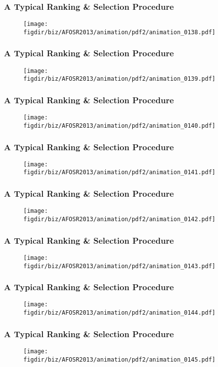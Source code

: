 \documentclass[13pt]{beamer}
\newcommand{\figdir}{../../fig}
\begin{document}
\begin{frame}\frametitle{A Typical Ranking \& Selection Procedure}\begin{figure}\texttt{[image: \\figdir/biz/AFOSR2013/animation/pdf2/animation\_0138.pdf]}\end{figure}\end{frame}
\begin{frame}\frametitle{A Typical Ranking \& Selection Procedure}\begin{figure}\texttt{[image: \\figdir/biz/AFOSR2013/animation/pdf2/animation\_0139.pdf]}\end{figure}\end{frame}
\begin{frame}\frametitle{A Typical Ranking \& Selection Procedure}\begin{figure}\texttt{[image: \\figdir/biz/AFOSR2013/animation/pdf2/animation\_0140.pdf]}\end{figure}\end{frame}
\begin{frame}\frametitle{A Typical Ranking \& Selection Procedure}\begin{figure}\texttt{[image: \\figdir/biz/AFOSR2013/animation/pdf2/animation\_0141.pdf]}\end{figure}\end{frame}
\begin{frame}\frametitle{A Typical Ranking \& Selection Procedure}\begin{figure}\texttt{[image: \\figdir/biz/AFOSR2013/animation/pdf2/animation\_0142.pdf]}\end{figure}\end{frame}
\begin{frame}\frametitle{A Typical Ranking \& Selection Procedure}\begin{figure}\texttt{[image: \\figdir/biz/AFOSR2013/animation/pdf2/animation\_0143.pdf]}\end{figure}\end{frame}
\begin{frame}\frametitle{A Typical Ranking \& Selection Procedure}\begin{figure}\texttt{[image: \\figdir/biz/AFOSR2013/animation/pdf2/animation\_0144.pdf]}\end{figure}\end{frame}
\begin{frame}\frametitle{A Typical Ranking \& Selection Procedure}\begin{figure}\texttt{[image: \\figdir/biz/AFOSR2013/animation/pdf2/animation\_0145.pdf]}\end{figure}\end{frame}
\end{document}

